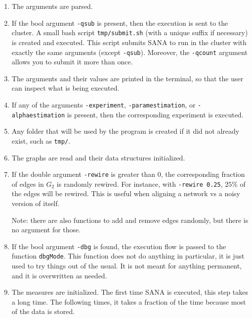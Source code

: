 \documentclass[]{article}
\begin{document}
\begin{enumerate}

\item The arguments are parsed.

\item If the bool argument \texttt{-qsub} is present, then the execution is sent to the cluster. A small bash script \texttt{tmp/submit.sh} (with a unique suffix if necessary) is created and executed. This script submits SANA to run in the cluster with exactly the same arguments (except \texttt{-qsub}). Moreover, the \texttt{-qcount} argument allows you to submit it more than once.

\item The arguments and their values are printed in the terminal, so that the user can inspect what is being executed.

\item If any of the arguments \texttt{-experiment}, \texttt{-paramestimation}, or \texttt{-alphaestimation} is present, then the corresponding experiment is executed.

\item Any folder that will be used by the program is created if it did not already exist, such as \texttt{tmp/}.

\item The graphs are read and their data structures initialized.

\item If the double argument \texttt{-rewire} is greater than $0$, the corresponding fraction of edges in $G_2$ is randomly rewired. For instance, with \texttt{-rewire 0.25}, $25\%$ of the edges will be rewired. This is useful when aligning a network vs a noisy version of itself.

Note: there are also functions to add and remove edges randomly, but there is no argument for those.

\item If the bool argument \texttt{-dbg} is found, the execution flow is passed to the function \texttt{dbgMode}. This function does not do anything in particular, it is just used to try things out of the usual. It is not meant for anything permanent, and it is overwritten as needed.

\item The measures are initialized. The first time SANA is executed, this step takes a long time. The following times, it takes a fraction of the time because most of the data is stored.


\end{enumerate}
\end{document}
